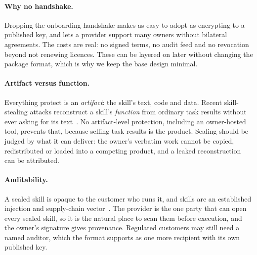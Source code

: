\paragraph{Why no handshake.}
Dropping the onboarding handshake makes \sys{} as easy to adopt as encrypting to a published key,
and lets a provider support many owners without bilateral agreements. The costs are real: no
signed terms, no audit feed and no revocation beyond not renewing licences. These can be layered
on later without changing the package format, which is why we keep the base design minimal.

\paragraph{Artifact versus function.}
Everything \sys{} protect is an \emph{artifact}: the skill's text, code and data. Recent skill-stealing
attacks reconstruct a skill's \emph{function} from ordinary task results without ever asking for its
text~\citep{tsai2026daydreaming,hua2026behavioral}. No artifact-level protection, including an
owner-hosted tool, prevents that, because selling task results is the product. Sealing should be
judged by what it can deliver: the owner's verbatim work cannot be copied, redistributed or loaded
into a competing product, and a leaked reconstruction can be attributed.

\paragraph{Auditability.}
A sealed skill is opaque to the customer who runs it, and skills are an established injection and
supply-chain vector~\citep{schmotz2026skillinject,xu2026agentskills}. The provider is the one party
that can open every sealed skill, so it is the natural place to scan them before execution, and the
owner's signature gives provenance. Regulated customers may still need a named auditor, which the
format supports as one more recipient with its own published key.

